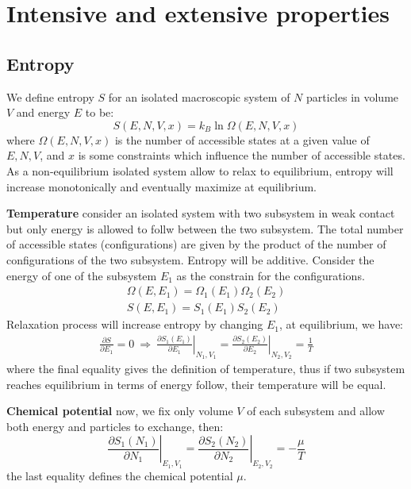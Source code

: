 \documentclass{article}
\begin{document}
\pagebreak
\section{Intensive and extensive properties}
\subsection{Entropy}
We define entropy $S$ for an isolated macroscopic system of $N$ particles in volume $V$ and energy $E$ to be:
\begin{equation}
    S(E,N,V,x) = k_B \ln\Omega(E,N,V,x)
\end{equation}
where $\Omega(E,N,V,x)$ is the number of accessible states at a given value of $E, N, V$, and $x$ is some constraints which 
influence the number of accessible states.
As a non-equilibrium isolated system allow to relax to equilibrium, entropy will increase monotonically and eventually maximize 
at equilibrium.

\textbf{Temperature} 
consider an isolated system with two subsystem in weak contact but only energy is allowed to follw between the two subsystem.
The total number of accessible states (configurations) are given by the product of the number of configurations of the 
two subsystem. Entropy will be additive. Consider the energy of one of the subsystem $E_1$
as the constrain for the configurations.
\begin{align}
    \Omega(E,E_1) = \Omega_1(E_1) \Omega_2(E_2) \\
    S(E,E_1) = S_1(E_1) S_2(E_2)   
\end{align}
Relaxation process will increase entropy by changing $E_1$, at equilibrium, we have:
\begin{gather}
    \frac{\partial S}{\partial E_1} = 0 \ \Rightarrow \ 
    \left. \frac{\partial S_1(E_1)}{\partial E_1} \right|_{N_1,V_1} = \left. \frac{\partial S_2(E_2)}{\partial E_2}\right|_{N_2,V_2} = \frac{1}{T} \label{defineT}
\end{gather}
where the final equality gives the definition of temperature, thus if two subsystem reaches equilibrium in terms of energy follow, their 
temperature will be equal.

\textbf{Chemical potential}
now, we fix only volume $V$ of each subsystem and allow both energy and particles to exchange, then:
\begin{equation}
    \left. \frac{\partial S_1(N_1)}{\partial N_1} \right|_{E_1,V_1} = \left. \frac{\partial S_2(N_2)}{\partial N_2}\right|_{E_2,V_2} = -\frac{\mu}{T}
\end{equation}
the last equality defines the chemical potential $\mu$. 
\end{document}
